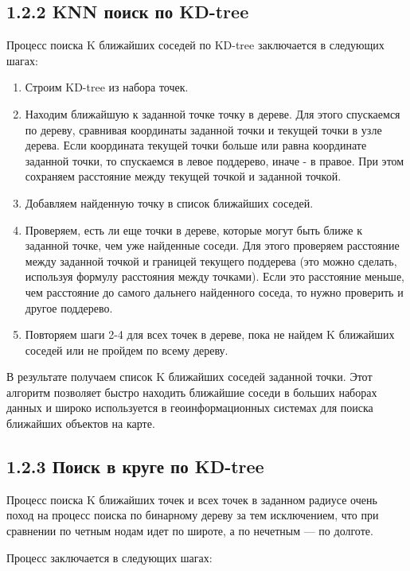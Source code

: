\subsection{1.2.2 KNN поиск по KD-tree}

Процесс поиска K ближайших соседей по KD-tree заключается в следующих шагах:

\begin{enumerate}
    \item Строим KD-tree из набора точек. 
    \item Находим ближайшую к заданной точке точку в дереве. Для этого спускаемся по дереву, сравнивая координаты заданной точки и текущей точки в узле дерева. Если координата текущей точки больше или равна координате заданной точки, то спускаемся в левое поддерево, иначе - в правое. При этом сохраняем расстояние между текущей точкой и заданной точкой.
    \item Добавляем найденную точку в список ближайших соседей.
    \item Проверяем, есть ли еще точки в дереве, которые могут быть ближе к заданной точке, чем уже найденные соседи. Для этого проверяем расстояние между заданной точкой и границей текущего поддерева (это можно сделать, используя формулу расстояния между точками). Если это расстояние меньше, чем расстояние до самого дальнего найденного соседа, то нужно проверить и другое поддерево.
    \item Повторяем шаги 2-4 для всех точек в дереве, пока не найдем K ближайших соседей или не пройдем по всему дереву.
\end{enumerate}

В результате получаем список K ближайших соседей заданной точки. Этот алгоритм позволяет быстро находить ближайшие соседи в больших наборах данных и широко используется в геоинформационных системах для поиска ближайших объектов на карте.

\subsection{1.2.3 Поиск в круге по KD-tree}
Процесс поиска K ближайших точек и всех точек в заданном радиусе очень поход на процесс поиска по бинарному дереву за тем исключением, что при сравнении по четным нодам идет по широте, а по нечетным — по долготе. 

Процесс заключается в следующих шагах:


